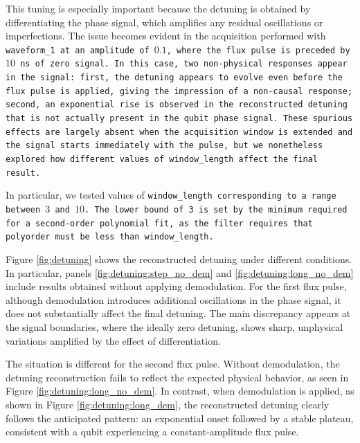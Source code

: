 This tuning is especially important because the detuning is obtained by differentiating the phase signal, which amplifies any residual oscillations or imperfections. 
The issue becomes evident in the acquisition performed with \tt{waveform\_1} at an amplitude of $0.1$, where the flux pulse is preceded by $10$ ns of zero signal. 
In this case, two non-physical responses appear in the signal: first, the detuning appears to evolve even before the flux pulse is applied, giving the impression of a non-causal response; second, an exponential rise is observed in the reconstructed detuning that is not actually present in the qubit phase signal. 
These spurious effects are largely absent when the acquisition window is extended and the signal starts immediately with the pulse, but we nonetheless explored how different values of \tt{window\_length} affect the final result.

In particular, we tested values of \tt{window\_length} corresponding to a range between $3$ and $10$. 
The lower bound of 3 is set by the minimum required for a second-order polynomial fit, as the filter requires that \tt{polyorder} must be less than \tt{window\_length}.

Figure \ref{fig:detuning} shows the reconstructed detuning under different conditions. 
In particular, panels \ref{fig:detuning:step_no_dem} and \ref{fig:detuning:long_no_dem} include results obtained without applying demodulation. 
For the first flux pulse, although demodulation introduces additional oscillations in the phase signal, it does not substantially affect the final detuning.
The main discrepancy appears at the signal boundaries, where the ideally zero detuning, shows sharp, unphysical variations amplified by the effect of differentiation.

The situation is different for the second flux pulse. 
Without demodulation, the detuning reconstruction fails to reflect the expected physical behavior, as seen in Figure \ref{fig:detuning:long_no_dem}. 
In contrast, when demodulation is applied, as shown in Figure \ref{fig:detuning:long_dem}, the reconstructed detuning clearly follows the anticipated pattern: an exponential onset followed by a stable plateau, consistent with a qubit experiencing a constant-amplitude flux pulse.

